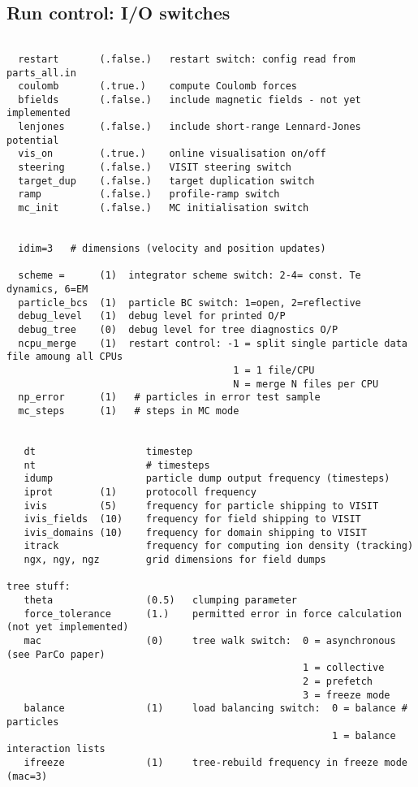 \documentclass[11pt,psfig]{article}
\begin{document}
\subsection{Run control: I/O switches}

\begin{verbatim}

  restart       (.false.)   restart switch: config read from parts_all.in
  coulomb       (.true.)    compute Coulomb forces
  bfields       (.false.)   include magnetic fields - not yet implemented
  lenjones      (.false.)   include short-range Lennard-Jones potential
  vis_on        (.true.)    online visualisation on/off
  steering      (.false.)   VISIT steering switch
  target_dup    (.false.)   target duplication switch
  ramp          (.false.)   profile-ramp switch
  mc_init       (.false.)   MC initialisation switch


  idim=3   # dimensions (velocity and position updates)

  scheme =      (1)  integrator scheme switch: 2-4= const. Te dynamics, 6=EM
  particle_bcs  (1)  particle BC switch: 1=open, 2=reflective
  debug_level   (1)  debug level for printed O/P
  debug_tree    (0)  debug level for tree diagnostics O/P
  ncpu_merge    (1)  restart control: -1 = split single particle data file amoung all CPUs
                                       1 = 1 file/CPU
                                       N = merge N files per CPU
  np_error      (1)   # particles in error test sample
  mc_steps      (1)   # steps in MC mode


   dt                   timestep
   nt                   # timesteps 
   idump                particle dump output frequency (timesteps)
   iprot        (1)     protocoll frequency
   ivis         (5)     frequency for particle shipping to VISIT
   ivis_fields  (10)    frequency for field shipping to VISIT
   ivis_domains (10)    frequency for domain shipping to VISIT
   itrack               frequency for computing ion density (tracking)
   ngx, ngy, ngz        grid dimensions for field dumps

tree stuff:
   theta                (0.5)   clumping parameter
   force_tolerance      (1.)    permitted error in force calculation (not yet implemented)
   mac                  (0)     tree walk switch:  0 = asynchronous  (see ParCo paper)
                                                   1 = collective
                                                   2 = prefetch
                                                   3 = freeze mode
   balance              (1)     load balancing switch:  0 = balance # particles
                                                        1 = balance interaction lists
   ifreeze              (1)     tree-rebuild frequency in freeze mode (mac=3)


\end{verbatim}
\end{document}
